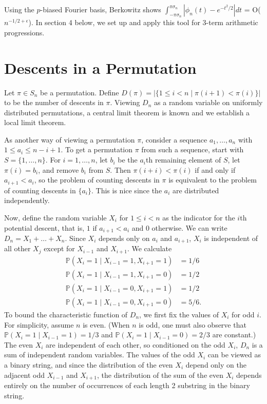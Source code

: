 \documentclass[12pt]{article} %
\newcommand{\abs}[1]{\left\lvert#1\right\rvert}
\renewcommand{\P}{\mathbb{P}}
\theoremstyle{definition}
\theoremstyle{remark}
\begin{document}
Using the $p$-biased Fourier basis, Berkowitz shows $\int_{-\pi\sigma_n}^{\pi\sigma_n} \abs{\phi_n(t) - e^{-t^2/2}} dt$ = O($n^{-1/2+\epsilon}$). In section 4 below, we set up and apply this tool for 3-term arithmetic progressions. 


\section{Descents in a Permutation}

Let $\pi \in S_n$ be a permutation. Define $D(\pi) = \abs{\{1 \leq i < n \mid \pi(i + 1) < \pi(i)\}}$ to be the number of descents in $\pi$. Viewing $D_n$ as a random variable on uniformly distributed permutations, a central limit theorem is known and we establish a local limit theorem.

	As another way of viewing a permutation $\pi$, consider a sequence $a_1, \ldots, a_n$ with $1 \leq a_i \leq n - i + 1$. To get a permutation $\pi$ from such a sequence, start with $S = \{1, \ldots, n\}$. For $i = 1, \ldots, n$, let $b_i$ be the $a_i$th remaining element of $S$, let $\pi(i) = b_i$, and remove $b_i$ from $S$. Then $\pi(i + i) < \pi(i)$ if and only if $a_{i+1} < a_i$, so the problem of counting descents in $\pi$ is equivalent to the problem of counting descents in $\{a_i\}$. This is nice since the $a_i$ are distributed independently.

	Now, define the random variable $X_i$ for $1 \leq i < n$ as the indicator for the $i$th potential descent, that is, $1$ if $a_{i+1} < a_i$ and $0$ otherwise. We can write $D_n = X_1 + \ldots + X_n$. Since $X_i$ depends only on $a_i$ and $a_{i+1}$, $X_i$ is independent of all other $X_j$ except for $X_{i-1}$ and $X_{i+1}$. We calculate
	\begin{align*}
		\P(X_i = 1 \mid X_{i-1} = 1, X_{i+1} = 1) &= 1/6 \\
		\P(X_i = 1 \mid X_{i-1} = 1, X_{i+1} = 0) &= 1/2 \\
		\P(X_i = 1 \mid X_{i-1} = 0, X_{i+1} = 1) &= 1/2 \\
		\P(X_i = 1 \mid X_{i-1} = 0, X_{i+1} = 0) &= 5/6.
	\end{align*}
	To bound the characteristic function of $D_n$, we first fix the values of $X_i$ for odd $i$. For simplicity, assume $n$ is even. (When $n$ is odd, one must also observe that $\P(X_i = 1 \mid X_{i-1} = 1) = 1/3$ and $\P(X_i = 1 \mid X_{i-1} = 0) = 2/3$ are constant.) The even $X_i$ are independent of each other, so conditioned on the odd $X_i$, $D_n$ is a sum of independent random variables. The values of the odd $X_i$ can be viewed as a binary string, and since the distribution of the even $X_i$ depend only on the adjacent odd $X_{i-1}$ and $X_{i+1}$, the distribution of the sum of the even $X_i$ depends entirely on the number of occurrences of each length 2 substring in the binary string.
\end{document}
